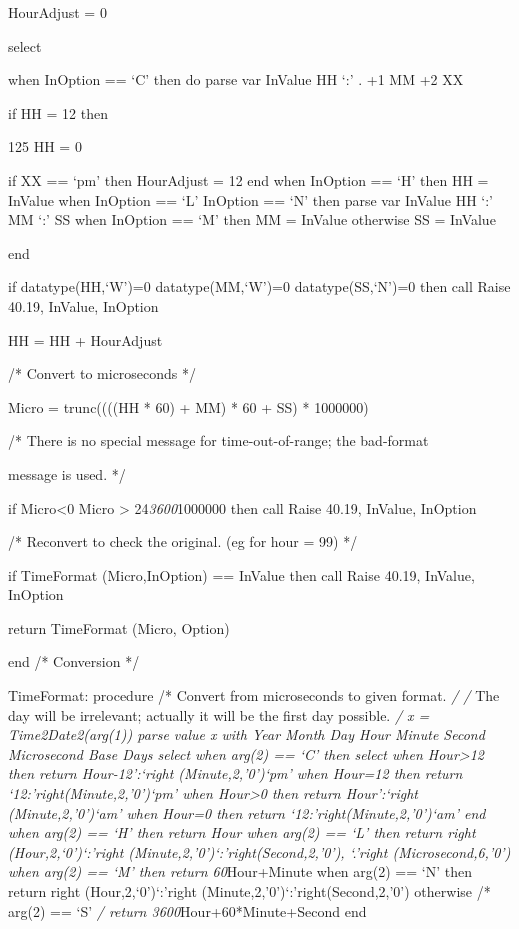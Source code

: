 HourAdjust = 0

select

when InOption == `C' then do parse var InValue HH `:' . +1 MM +2 XX

if HH = 12 then

125 HH = 0

if XX == `pm' then HourAdjust = 12 end when InOption == `H' then HH =
InValue when InOption == `L' \textbar{} InOption == `N' then parse var
InValue HH `:' MM `:' SS when InOption == `M' then MM = InValue
otherwise SS = InValue

end

if datatype(HH,`W')=0 \textbar{} datatype(MM,`W')=0 \textbar{}
datatype(SS,`N')=0 then call Raise 40.19, InValue, InOption

HH = HH + HourAdjust

/* Convert to microseconds */

Micro = trunc((((HH * 60) + MM) * 60 + SS) * 1000000)

/* There is no special message for time-out-of-range; the bad-format

message is used. */

if Micro\textless0 \textbar{} Micro \textgreater{} 24\emph{3600}1000000
then call Raise 40.19, InValue, InOption

/* Reconvert to check the original. (eg for hour = 99) */

if TimeFormat (Micro,InOption) == InValue then call Raise 40.19,
InValue, InOption

return TimeFormat (Micro, Option)

end /* Conversion */

TimeFormat: procedure /* Convert from microseconds to given format.
\emph{/ /} The day will be irrelevant; actually it will be the first day
possible. \emph{/ x = Time2Date2(arg(1)) parse value x with Year Month
Day Hour Minute Second Microsecond Base Days select when arg(2) == `C'
then select when Hour\textgreater12 then return Hour-12':`right
(Minute,2,'0')`pm' when Hour=12 then return `12:'right(Minute,2,'0')`pm'
when Hour\textgreater0 then return Hour':`right (Minute,2,'0')`am' when
Hour=0 then return `12:'right(Minute,2,'0')`am' end when arg(2) == `H'
then return Hour when arg(2) == `L' then return right
(Hour,2,`0')`:'right (Minute,2,'0')`:'right(Second,2,'0'),
\textbar\textbar{} `.'right (Microsecond,6,'0') when arg(2) == `M' then
return 60}Hour+Minute when arg(2) == `N' then return right
(Hour,2,`0')`:'right (Minute,2,'0')`:'right(Second,2,'0') otherwise /*
arg(2) == `S' \emph{/ return 3600}Hour+60*Minute+Second end


